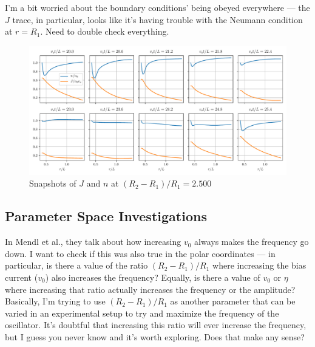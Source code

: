 \documentclass[12pt]{article}
\begin{document}
	I'm a bit worried about the boundary conditions' being obeyed everywhere --- the $J$ trace, in particular, looks like it's having trouble with the Neumann condition at $r = R_1$. Need to double check everything. 
	\begin{figure}[H]
		\centering
		\includegraphics[width=\textwidth]{Figures/varyRatioSnapshot.pdf}
		\caption{Snapshots of $J$ and $n$ at $(R_2 - R_1) / R_1 = 2.500$}\label{fig:varyRatioSnapshots}
	\end{figure}
	
	\subsection{Parameter Space Investigations}
	In Mendl et al., they talk about how increasing $v_0$ always makes the frequency go down.  I want to check if this was also true in the polar coordinates --- in particular, is there a value of the ratio $(R_2 - R_1) / R_1$ where increasing the bias current ($v_0$) also increases the frequency?  Equally, is there a value of $v_0$ or $\eta$ where increasing that ratio actually increases the frequency or the amplitude? Basically, I'm trying to use $(R_2 - R_1) / R_1$ as another parameter that can be varied in an experimental setup to try and maximize the frequency of the oscillator.  It's doubtful that increasing this ratio will ever increase the frequency, but I guess you never know and it's worth exploring.  Does that make any sense?
		 
\end{document}
